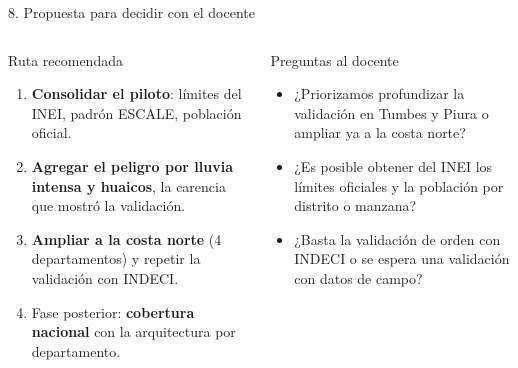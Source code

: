 \documentclass[aspectratio=169,11pt]{beamer}
\begin{document}
\begin{frame}{8. Propuesta para decidir con el docente}
\begin{columns}[T]
\begin{block}{Ruta recomendada}\small
\begin{enumerate}
\item \textbf{Consolidar el piloto}: límites del INEI, padrón ESCALE, población oficial.
\item \textbf{Agregar el peligro por lluvia intensa y huaicos}, la carencia que mostró la validación.
\item \textbf{Ampliar a la costa norte} (4 departamentos) y repetir la validación con INDECI.
\item Fase posterior: \textbf{cobertura nacional} con la arquitectura por departamento.
\end{enumerate}
\end{block}
\begin{exampleblock}{Preguntas al docente}\small
\begin{itemize}
\item ¿Priorizamos profundizar la validación en Tumbes y Piura o ampliar ya a la costa norte?
\item ¿Es posible obtener del INEI los límites oficiales y la población por distrito o manzana?
\item ¿Basta la validación de orden con INDECI o se espera una validación con datos de campo?
\end{itemize}
\end{exampleblock}
\end{columns}
\end{frame}

{
\begin{frame}
\end{frame}}
\end{document}
